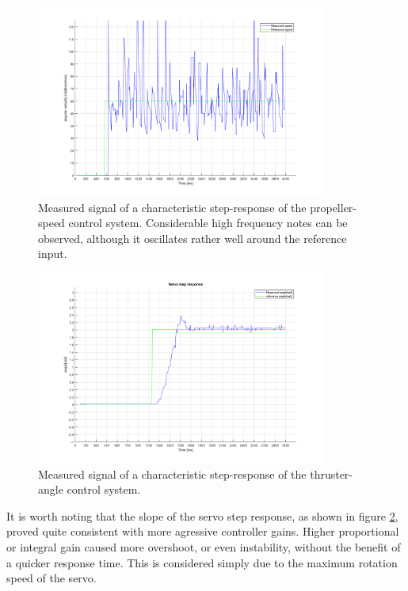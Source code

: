 \begin{figure}[H]
	\centering
	\includegraphics[width=0.85\textwidth]{img/4e-2_2e-2_0_130hz_n=8}
	\caption{Measured signal of a characteristic step-response of the propeller-speed control system. Considerable high frequency notes can be observed, although it oscillates rather well around the reference input.}
	\label{delfiaLowStepProp1}
\end{figure}

\begin{figure}[H]
	\centering
	\includegraphics[width=0.85\textwidth]{img/Kp_1e0_Ki_8e-3_Kd_4}
	\caption{Measured signal of a characteristic step-response of the thruster-angle control system.}
	\label{delfiaLowStepServ1}
\end{figure}

It is worth noting that the slope of the servo step response, as shown in figure \ref{delfiaLowStepServ1}, proved quite consistent with more agressive controller gains. Higher proportional or integral gain caused more overshoot, or even instability, without the benefit of a quicker response time. This is considered simply due to the maximum rotation speed of the servo. 


